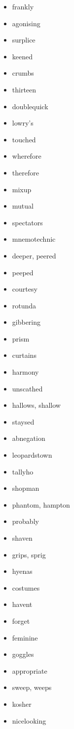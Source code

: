 \documentclass{article}
\begin{document}
\begin{itemize}
    \item frankly
    \item agonising
    \item surplice
    \item keened
    \item crumbs
    \item thirteen
    \item doublequick
    \item lowry's
    \item touched
    \item wherefore
    \item therefore
    \item mixup
    \item mutual
    \item spectators
    \item mnemotechnic
    \item deeper, peered
    \item peeped
    \item courtesy
    \item rotunda
    \item gibbering
    \item prism
    \item curtains
    \item harmony
    \item unscathed
    \item hallows, shallow
    \item staysed
    \item abnegation
    \item leopardstown
    \item tallyho
    \item shopman
    \item phantom, hampton
    \item probably
    \item shaven
    \item grips, sprig
    \item hyenas
    \item costumes
    \item havent
    \item forget
    \item feminine
    \item goggles
    \item appropriate
    \item sweep, weeps
    \item kosher
    \item nicelooking

\end{itemize}
\end{document}
